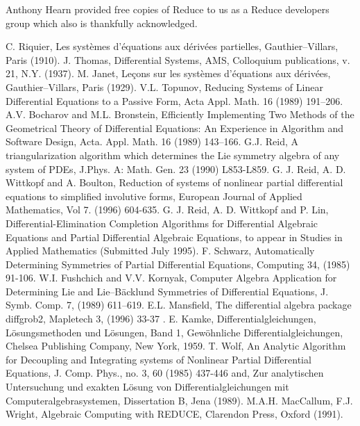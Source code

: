 \documentclass[12pt]{article}
\begin{document}
Anthony Hearn provided free copies of {\sc Reduce} to us as a
{\sc Reduce} developers group which also is thankfully acknowledged.

\begin{thebibliography}{99}
 C. Riquier, Les syst\`{e}mes d'\'{e}quations aux d\'{e}riv\'{e}es
partielles, Gauthier--Villars, Paris (1910).
 J. Thomas, Differential Systems, AMS, Colloquium
publications, v. 21, N.Y. (1937).
 M. Janet, Le\c{c}ons sur les syst\`{e}mes d'\'{e}quations aux
d\'{e}riv\'{e}es, Gauthier--Villars, Paris (1929).
 V.L. Topunov, Reducing Systems of Linear Differential
Equations to a Passive Form, Acta Appl. Math. 16 (1989) 191--206.
 A.V. Bocharov and M.L. Bronstein, Efficiently
Implementing Two Methods of the Geometrical Theory of Differential
Equations: An Experience in Algorithm and Software Design, Acta. Appl.
Math. 16 (1989) 143--166.
 G.J. Reid, A triangularization algorithm which
determines the Lie symmetry algebra of any system of PDEs, J.Phys. A:
Math. Gen. 23 (1990) L853-L859.
 G. J. Reid, A. D. Wittkopf and A. Boulton, Reduction
of systems of nonlinear partial differential equations to simplified
involutive forms, European Journal of Applied Mathematics,
Vol 7. (1996) 604-635.
 G. J. Reid, A. D. Wittkopf and P. Lin,
Differential-Elimination Completion Algorithms for Differential Algebraic
Equations and Partial Differential Algebraic Equations, to appear in
Studies in Applied Mathematics (Submitted July 1995).
 F. Schwarz, Automatically Determining Symmetries of Partial
Differential Equations, Computing 34, (1985) 91-106.
 W.I. Fushchich and V.V. Kornyak, Computer Algebra
Application for Determining Lie and Lie--B\"{a}cklund Symmetries of
Differential Equations, J. Symb. Comp. 7, (1989) 611--619.
 E.L. Mansfield,
The differential algebra package diffgrob2, Mapletech 3, (1996) 33-37 .
 E. Kamke, Differentialgleichungen, L\"{o}sungsmethoden
und L\"{o}sungen, Band 1, Gew\"{o}hnliche Differentialgleichungen,
Chelsea Publishing Company, New York, 1959.
 T. Wolf, An Analytic Algorithm for Decoupling and Integrating
systems of Nonlinear Partial Differential Equations, J. Comp. Phys.,
no. 3, 60 (1985) 437-446 and, Zur analytischen Untersuchung und exakten
L\"{o}sung von Differentialgleichungen mit Computeralgebrasystemen,
Dissertation B, Jena (1989).
 M.A.H. MacCallum, F.J. Wright, Algebraic Computing with REDUCE,
Clarendon Press, Oxford (1991).

\end{thebibliography}
\end{document}

